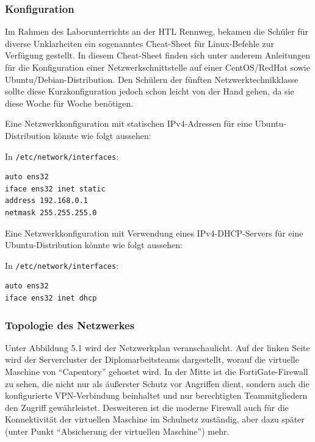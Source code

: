 \hypertarget{konfiguration}{%
\subsubsection{Konfiguration}\label{konfiguration}}

Im Rahmen des Laborunterrichts an der HTL Rennweg, bekamen die Schüler
für diverse Unklarheiten ein sogenanntes Cheat-Sheet \cite{cheat} für
Linux-Befehle zur Verfügung gestellt. In diesem Cheat-Sheet finden sich
unter anderem Anleitungen für die Konfiguration einer
Netzwerkschnittstelle auf einer CentOS/RedHat sowie
Ubuntu/Debian-Distribution. Den Schülern der fünften
Netzwerktechnikklasse sollte diese Kurzkonfiguration jedoch schon leicht
von der Hand gehen, da sie diese Woche für Woche benötigen.

Eine Netzwerkkonfiguration mit statischen IPv4-Adressen für eine
Ubuntu-Distribution könnte wie folgt aussehen:

In \texttt{/etc/network/interfaces}:

\begin{verbatim}
auto ens32
iface ens32 inet static
address 192.168.0.1
netmask 255.255.255.0
\end{verbatim}

Eine Netzwerkkonfiguration mit Verwendung eines IPv4-DHCP-Servers für
eine Ubuntu-Distribution könnte wie folgt aussehen:

In \texttt{/etc/network/interfaces}:

\begin{verbatim}
auto ens32
iface ens32 inet dhcp
\end{verbatim}

\hypertarget{topologie-des-netzwerkes}{%
\subsubsection{Topologie des
Netzwerkes}\label{topologie-des-netzwerkes}}

Unter Abbildung 5.1 wird der Netzwerkplan veranschaulicht. Auf der
linken Seite wird der Servercluster der Diplomarbeitsteams dargestellt,
worauf die virtuelle Maschine von ``Capentory'' gehostet wird. In der
Mitte ist die FortiGate-Firewall zu sehen, die nicht nur als äußerster
Schutz vor Angriffen dient, sondern auch die konfigurierte
VPN-Verbindung beinhaltet und nur berechtigten Teammitgliedern den
Zugriff gewährleistet. Desweiteren ist die moderne Firewall auch für die
Konnektivität der virtuellen Maschine im Schulnetz zuständig, aber dazu
später (unter Punkt ``Absicherung der virtuellen Maschine'') mehr.

